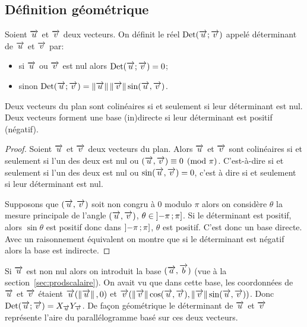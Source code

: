 \subsection{Définition géométrique}
\begin{defdef}
  Soient $\overrightarrow{u}$ et $\overrightarrow{v}$ deux vecteurs. On définit le réel $\operatorname{Det}(\overrightarrow{u};\overrightarrow{v})$ appelé déterminant de $\overrightarrow{u}$ et $\overrightarrow{v}$ par:
  \begin{itemize}
  \item si $\overrightarrow{u}$ ou $\overrightarrow{v}$ est nul alors $\operatorname{Det}(\overrightarrow{u};\overrightarrow{v})=0$;
  \item sinon $\operatorname{Det}(\overrightarrow{u};\overrightarrow{v})=\left\lVert\overrightarrow{u}\right\rVert\left\lVert\overrightarrow{v}\right\rVert \sin(\overrightarrow{u},\overrightarrow{v})$.
  \end{itemize}
\end{defdef}
\begin{prop}
  Deux vecteurs du plan sont colinéaires si et seulement si leur déterminant est nul. Deux vecteurs forment une base (in)directe si leur déterminant est positif (négatif).
\end{prop}
\begin{proof}
  Soient $\overrightarrow{u}$ et $\overrightarrow{v}$ deux vecteurs du plan. Alors $\overrightarrow{u}$ et $\overrightarrow{v}$ sont colinéaires si et seulement si l'un des deux est nul ou $(\overrightarrow{u},\overrightarrow{v}) \equiv 0 \pmod {\pi}$. C'est-à-dire si et seulement si l'un des deux est nul ou $ \sin(\overrightarrow{u},\overrightarrow{v}) = 0$, c'est à dire si et seulement si leur déterminant est nul.

  Supposons que $(\overrightarrow{u},\overrightarrow{v})$ soit non congru à 0 modulo $\pi$ alors on considère $\theta$ la mesure principale de l'angle $(\overrightarrow{u},\overrightarrow{v})$, $\theta \in \left] -\pi \, ;  \pi \right]$. Si le déterminant est positif, alors $\sin \theta$ est positif donc dans $\left] -\pi \, ;  \pi  \right]$, $\theta$ est positif. C'est donc un base directe. Avec un raisonnement équivalent on montre que si le déterminant est négatif alors la base est indirecte.
\end{proof}

Si $\overrightarrow{u}$ est non nul alors on introduit la base $(\overrightarrow{a},\overrightarrow{b})$ (vue à la section~\ref{sec:prodscalaire}). On avait vu que dans cette base, les coordonnées de $\overrightarrow{u}$ et $\overrightarrow{v}$ étaient $\overrightarrow{u}(\left\lVert\overrightarrow{u}\right\rVert,0)$ et $\overrightarrow{v}(\left\lVert\overrightarrow{v}\right\rVert \cos(\overrightarrow{u},\overrightarrow{v}),\left\lVert\overrightarrow{v}\right\rVert \sin(\overrightarrow{u},\overrightarrow{v}))$. Donc $\operatorname{Det}(\overrightarrow{u};\overrightarrow{v})=X_{\overrightarrow{u}} Y_{\overrightarrow{v}}$. De façon géométrique le déterminant de $\overrightarrow{u}$ et $\overrightarrow{v}$ représente l'aire du parallélogramme basé sur ces deux vecteurs.

